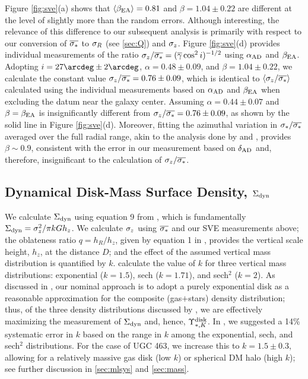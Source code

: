 \documentclass[apj,iop,numberedappendix]{emulateapj}
\begin{document}
Figure \ref{fig:sve}(a) shows that $\langle \beta_{\rm EA} \rangle = 0.81$ and
$\beta=1.04\pm 0.22$ are different at the level of slightly more than the random
errors.  Although interesting, the relevance of this difference to our
subsequent analysis is primarily with respect to our conversion of
$\overline{\sigma_{\ast}}$ to $\sigma_R$ (see \sect \ref{sec:Q}) and $\sigma_z$.  Figure
\ref{fig:sve}(d) provides individual measurements of the ratio
$\sigma_z/\overline{\sigma_{\ast}} = (\overline{\gamma}\cos^2i)^{-1/2}$ using $\alpha_{\rm
AD}$ and $\beta_{\rm EA}$.  Adopting $i=27\arcdeg\pm2\arcdeg$, $\alpha =
0.48\pm0.09$, and $\beta = 1.04\pm0.22$, we calculate the constant value
$\sigma_z/\overline{\sigma_{\ast}} = 0.76\pm0.09$, which is identical to
$\langle \sigma_z/\overline{\sigma_{\ast}} \rangle$ calculated using the individual measurements
based on $\alpha_{\rm AD}$ and $\beta_{\rm EA}$ when excluding the datum near
the galaxy center.  Assuming $\alpha = 0.44\pm0.07$ and $\beta = \beta_{\rm EA}$
is insignificantly different from $\sigma_z/\overline{\sigma_{\ast}} = 0.76\pm0.09$, as
shown by the solid line in Figure \ref{fig:sve}(d).  Moreover, fitting the
azimuthal variation in $\sigma_{\ast}/\overline{\sigma_{\ast}}$ averaged over the full radial
range, akin to the analysis done by \citet{1997MNRAS.288..618G,
2000MNRAS.317..545G} and \citet{2003AJ....126.2707S}, provides $\beta\sim0.9$,
consistent with the error in our measurement based on $\delta_{\rm AD}$ and, therefore,
insignificant to the calculation of $\sigma_z/\overline{\sigma_{\ast}}$.

\subsection{Dynamical Disk-Mass Surface Density, $\Sigma_{\rm dyn}$}
\label{sec:sdd}

We calculate $\Sigma_{\rm dyn}$ using equation 9 from ,
which is fundamentally $\Sigma_{\rm dyn} = \sigma_z^2/\pi k G h_z$.  We calculate $\sigma_z$
using $\overline{\sigma_{\ast}}$ and our SVE measurements above; the oblateness ratio
$q=h_R/h_z$, given by equation 1 in , provides
the vertical scale height, $h_z$, at the distance $D$; and the effect of the
assumed vertical mass distribution is quantified by $k$.
\citet{1988A&A...192..117V} calculate the value of $k$ for three vertical mass
distributions: exponential ($k=1.5$), sech ($k=1.71$), and sech$^2$ ($k=2$).  As
discussed in , our nominal approach is to adopt
a purely exponential disk as a reasonable approximation for the composite
(gas$+$stars) density distribution; thus, of the three density distributions
discussed by \citet{1988A&A...192..117V}, we are effectively maximizing the
measurement of $\Sigma_{\rm dyn}$ and, hence, $\Upsilon_{\ast,K}^{\rm disk}$.  In
, we suggested a 14\% systematic error in $k$
based on the range in $k$ among the exponential, sech, and sech$^2$
distributions.  For the case of UGC 463, we increase this to $k = 1.5\pm0.3$,
allowing for a relatively massive gas disk (low $k$) or spherical DM halo (high
$k$); see further discussion in \sects \ref{sec:mlsys} and \ref{sec:mass}.
\end{document}
